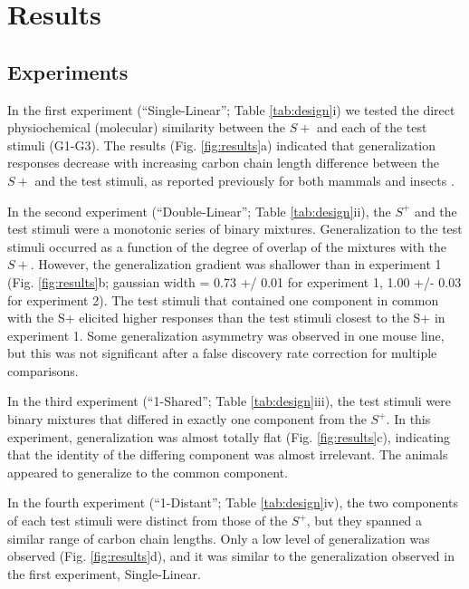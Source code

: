 \section*{Results}
\label{results}
\subsection*{Experiments}
\label{results_experiments}
In the first experiment (``Single-Linear''; Table \ref{tab:design}i) we tested the direct physiochemical (molecular) similarity between the $S+$ and each of the test stimuli (G1-G3). 
The results (Fig. \ref{fig:results}a) indicated that generalization responses decrease with increasing carbon chain length difference between the $S+$ and the test stimuli, as reported previously for both mammals and insects \cite{18810459}\cite{24488965}\cite{11551996}\cite{19129384}.  

In the second experiment (``Double-Linear''; Table \ref{tab:design}ii), the $S^+$ and the test stimuli were a monotonic series of binary mixtures.
Generalization to the test stimuli occurred as a function of the degree of overlap of the mixtures with the $S+$. 
However, the generalization gradient was shallower than in experiment 1 (Fig. \ref{fig:results}b; gaussian width = 0.73 +/ 0.01 for experiment 1, 1.00 +/- 0.03 for experiment 2). 
The test stimuli that contained one component in common with the S+ elicited higher responses than the test stimuli closest to the S+ in experiment 1. 
Some generalization asymmetry was observed in one mouse line, but this was not significant after a false discovery rate correction for multiple comparisons.   

In the third experiment (``1-Shared''; Table \ref{tab:design}iii), the test stimuli were binary mixtures that differed in exactly one component from the $S^+$.  
In this experiment, generalization was almost totally flat (Fig. \ref{fig:results}c), indicating that the identity of the differing component was almost irrelevant.  
The animals appeared to generalize to the common component.  

In the fourth experiment (``1-Distant''; Table \ref{tab:design}iv), the two components of each test stimuli were distinct from those of the $S^+$, but they spanned a similar range of carbon chain lengths. 
Only a low level of generalization was observed (Fig. \ref{fig:results}d), and it was similar to the generalization observed in the first experiment, Single-Linear.  

